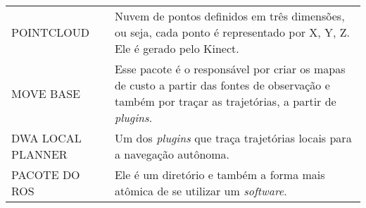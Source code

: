 \begin{table}[h]
\begin{tabular}{p{2.5cm}|p{12cm}}
POINTCLOUD                  & Nuvem de pontos definidos em três dimensões, ou seja, cada ponto é representado por X, Y, Z. Ele é gerado pelo Kinect.                                                                                                                                                                                                                                                     \\
MOVE BASE                  & Esse pacote é o responsável por criar os mapas de custo a partir das fontes de observação e também por traçar as trajetórias, a partir de \textit{plugins}.
\\
DWA LOCAL PLANNER         & Um dos \textit{plugins} que traça trajetórias locais para a navegação autônoma.
\\
PACOTE DO ROS               & Ele é um diretório e também a forma mais atômica de se utilizar um \textit{software}.
\end{tabular}
\label{tab:glossario}
\end{table}
